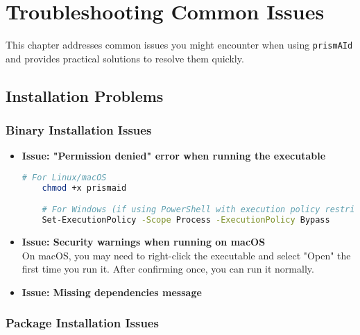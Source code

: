 \chapter{Troubleshooting Common Issues} \label{chap:troubleshooting}

This chapter addresses common issues you might encounter when using \texttt{prismAId} and provides practical solutions to resolve them quickly.

\section{Installation Problems}

\subsection{Binary Installation Issues}

\begin{itemize}
    \item \textbf{Issue: "Permission denied" error when running the executable}

    \begin{commandbox}
    \begin{lstlisting}[language=Bash]
    # For Linux/macOS
    chmod +x prismaid

    # For Windows (if using PowerShell with execution policy restrictions)
    Set-ExecutionPolicy -Scope Process -ExecutionPolicy Bypass
    \end{lstlisting}
    \end{commandbox}

    \item \textbf{Issue: Security warnings when running on macOS}
    \\
    On macOS, you may need to right-click the executable and select "Open" the first time you run it. After confirming once, you can run it normally.

    \item \textbf{Issue: Missing dependencies message}

\end{itemize}

\subsection{Package Installation Issues}

